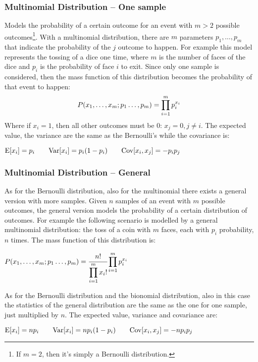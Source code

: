 \subsubsection{Multinomial Distribution -- One sample}
Models the probability of a certain outcome for an event with $m>2$ possible outcomes\footnote{If $m=2$, then it's simply a Bernoulli distribution.}. \newline
With a multinomial distribution, there are $m$ parameters $p_1, \hdots, p_m$ that indicate the probability of the $j$ outcome to happen. \newline
For example this model represents the tossing of a dice one time, where $m$ is the number of faces of the dice and $p_i$ is the probability of face $i$ to exit. \newline
Since only one sample is considered, then the mass function of this distribution becomes the probability of that event to happen:
\begin{equation}
	P(x_1,\hdots,x_m;p_1\hdots,p_m)=\displaystyle\prod_{i=1}^mp_i^{x_i}
	\label{eq:MultinomialMassFunction}
\end{equation}
Where if $x_i=1$, then all other outcomes must be 0: $x_j=0, j\neq i$. 
The expected value, the variance are the same as the Bernoulli's while the covariance is:
\begin{center}
	$\displaystyle \text{E}[x_i]=p_i\qquad \text{Var}[x_i]=p_i(1-p_i)\qquad \text{Cov}[x_i, x_j]=-p_ip_j$
\end{center}
%
\subsubsection{Multinomial Distribution -- General}
As for the Bernoulli distribution, also for the multinomial there exists a general version with more samples.\newline
Given $n$ samples of an event with $m$ possible outcomes, the general version models the probability of a certain distribution of outcomes. \newline
For example the following scenario is modelled by a general multinomial distribution: the toss of a coin with $m$ faces, each with $p_i$ probability, $n$ times. \newline
The mass function of this distribution is:
\begin{center}
	$\displaystyle P(x_1,\hdots,x_m;p_1\hdots,p_m)=\cfrac{n!}{\displaystyle\prod_{i=1}^mx_i!}\displaystyle\prod_{i=1}^mp_i^{x_i}$
\end{center}
As for the Bernoulli distribution and the bionomial distribution, also in this case the statistics of the general distribution are the same as the one for one sample, just multiplied by $n$. The expected value, variance and covariance are:
\begin{center}
  $\displaystyle \text{E}[x_i]=np_i\qquad \text{Var}[x_i]=np_i(1-p_i)\qquad\text{Cov}[x_i,x_j]=-np_ip_j$
\end{center}
%
%
%
